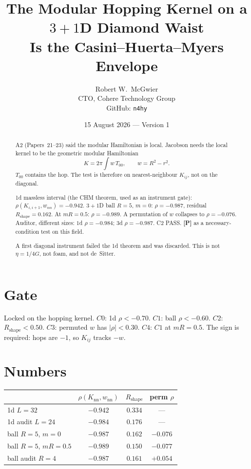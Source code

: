 \documentclass[11pt]{article}
\title{\textbf{The Modular Hopping Kernel on a $3{+}1$D Diamond Waist\\
Is the Casini--Huerta--Myers Envelope}}
\author{Robert W.\ McGwier\\
\small CTO, Cohere Technology Group\\
\small GitHub: \texttt{n4hy}}
\date{15 August 2026 --- Version 1}
\newcommand{\pP}{\textbf{[P]}}
\begin{document}
\maketitle

\begin{abstract}
\noindent
A2 (Papers~21--23) said the modular Hamiltonian is local. Jacobson
needs the local kernel to be the geometric modular Hamiltonian
\cite{BW1975,CHM2011}
\[
K=2\pi\int w\,T_{00},\qquad w=R^2-r^2.
\]
$T_{00}$ contains the hop. The test is therefore on nearest-neighbour
$K_{ij}$, not on the diagonal.

1d massless interval (the CHM theorem, used as an instrument gate):
$\rho(K_{i,i+1},w_{nn})=-0.942$.
$3{+}1$D ball $R=5$, $m=0$: $\rho=-0.987$, residual $R_{\mathrm{shape}}=0.162$.
At $mR=0.5$: $\rho=-0.989$.
A permutation of $w$ collapses to $\rho=-0.076$.
Auditor, different sizes: $1$d $\rho=-0.984$; $3$d $\rho=-0.987$.
C2 PASS. \pP{} as a necessary-condition test on this field.

A first diagonal instrument failed the 1d theorem and was discarded.
This is not $\eta=1/4G$, not foam, and not de~Sitter.
\end{abstract}

\section{Gate}

Locked on the hopping kernel. $C0$: 1d $\rho<-0.70$. $C1$: ball
$\rho<-0.60$. $C2$: $R_{\mathrm{shape}}<0.50$. $C3$: permuted $w$
has $|\rho|<0.30$. $C4$: $C1$ at $mR=0.5$. The sign is required:
hops are $-1$, so $K_{ij}$ tracks $-w$.

\section{Numbers}

\begin{center}
\begin{tabular}{lccc}
\hline
 & $\rho(K_{\mathrm{nn}},w_{\mathrm{nn}})$ & $R_{\mathrm{shape}}$ & perm $\rho$ \\
\hline
1d $L=32$ & $-0.942$ & $0.334$ & --- \\
1d audit $L=24$ & $-0.984$ & $0.176$ & --- \\
ball $R=5$, $m=0$ & $-0.987$ & $0.162$ & $-0.076$ \\
ball $R=5$, $mR=0.5$ & $-0.989$ & $0.150$ & $-0.077$ \\
ball audit $R=4$ & $-0.987$ & $0.161$ & $+0.054$ \\
\hline
\end{tabular}
\end{center}
\end{document}
